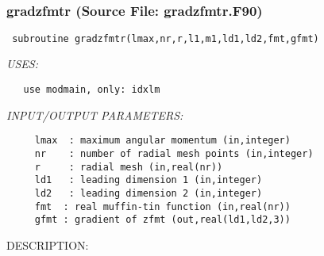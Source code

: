 \documentclass[11pt]{article}
\begin{document}











 
 
\mbox{}\hrulefill\ 
 
\subsubsection{gradzfmtr (Source File: gradzfmtr.F90)}


\begin{verbatim} subroutine gradzfmtr(lmax,nr,r,l1,m1,ld1,ld2,fmt,gfmt)\end{verbatim}{\em USES:}
\begin{verbatim}   use modmain, only: idxlm\end{verbatim}{\em INPUT/OUTPUT PARAMETERS:}
\begin{verbatim}     lmax  : maximum angular momentum (in,integer)
     nr    : number of radial mesh points (in,integer)
     r     : radial mesh (in,real(nr))
     ld1   : leading dimension 1 (in,integer)
     ld2   : leading dimension 2 (in,integer)
     fmt  : real muffin-tin function (in,real(nr))
     gfmt : gradient of zfmt (out,real(ld1,ld2,3))\end{verbatim}
{\sf DESCRIPTION:\\ }
\end{document}
